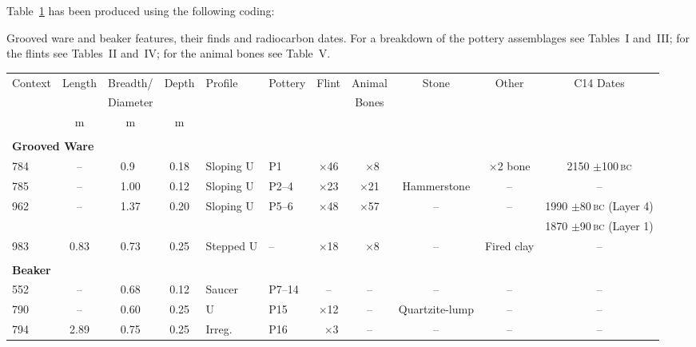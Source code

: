 Table~\ref{sideways} has been produced using the following coding:
%
\begin{smallverbatim}
\begin{table}
  \processtable
  {Grooved ware and beaker features, their finds and
    radiocarbon dates. For a breakdown of the pottery assemblages see
    Tables~I and~III; for the flints see Tables~II and~IV; for the animal
    bones see Table~V.\label{sideways}}
  {\addtolength\tabcolsep{-2pt}
    \begin{tabular}{lcccllccccc}
    Context & Length & Breadth/  & Depth & Profile & Pottery & Flint & Animal
                                                     & Stone & Other & C14 Dates\\
    && Diameter &&&&& Bones\\[6pt]
    & m & m & m\\
    \hline\\[-5pt]
    \multicolumn{10}{l}{\textbf{Grooved Ware}}\\
    784 & --   & 0.9$\phantom{0}$ &0.18  & Sloping U & P1      & $\times$46
          & $\phantom{0}$$\times$8 && $\times$2 bone & 2150 $\pm$100\,\textsc{bc}\\
    785 & --   & 1.00             &0.12   & Sloping U & P2--4  & $\times$23
                                             & $\times$21 & Hammerstone & -- & --\\
    962 & --   & 1.37             &0.20   & Sloping U & P5--6  & $\times$48
                       & $\times$57 & --& --& 1990 $\pm$80\,\textsc{bc} (Layer 4)\\
    &&&&&&&&&& 1870 $\pm$90\,\textsc{bc} (Layer 1)\\
    983 & 0.83 & 0.73             &0.25   & Stepped U & --     & $\times$18
                                  & $\phantom{0}$$\times$8 & -- & Fired clay & --\\
    &&&&&&&&&&\\
    \multicolumn{10}{l}{\textbf{Beaker}}\\
    552 & --   & 0.68             & 0.12  & Saucer    & P7--14 & --           & --
                                                                     & -- &-- &--\\
    790 & --   & 0.60             & 0.25  & U         & P15    & $\times$12   & --
                                                        & Quartzite-lump & -- &--\\
    794 & 2.89 & 0.75             & 0.25  & Irreg.    & P16    & $\phantom{0}$$\times$3
                                                                & -- & -- &-- &--\\
    \end{tabular}}
\end{table}
\end{smallverbatim}

